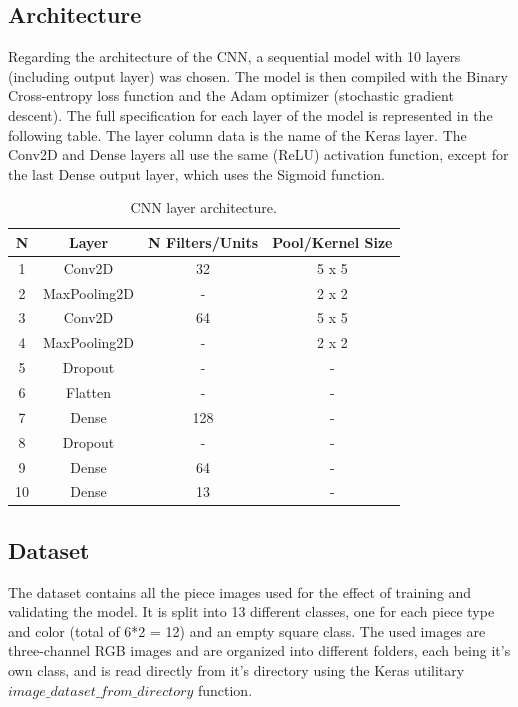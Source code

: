 \documentclass[10pt]{article}
\begin{document}
\subsection{Architecture}

Regarding the architecture of the CNN, a sequential \cite{3} model with 10 layers (including output layer) was chosen. The model is then compiled with the Binary Cross-entropy loss function and the Adam optimizer (stochastic gradient descent). The full specification for each layer of the model is represented in the following table. The layer column data is the name of the Keras layer. The Conv2D and Dense layers all use the same (ReLU) activation function, except for the last Dense output layer, which uses the Sigmoid function.

\begin{table}[H]
	\centering
	\begin{tabular}{||c c c c||} 
		\hline
		N & Layer & N Filters/Units & Pool/Kernel Size \\ [0.5ex] 
		\hline\hline
		1 & Conv2D & 32 & 5 x 5\\ 
		\hline
		2 & MaxPooling2D & - & 2 x 2 \\
		\hline
		3 & Conv2D & 64 & 5 x 5 \\
		\hline
		4 & MaxPooling2D & - & 2 x 2 \\
		\hline
		5 & Dropout & - & - \\ [1ex] 
		\hline
		6 & Flatten & - & - \\ [1ex] 
		\hline
		7 & Dense & 128 & - \\ [1ex] 
		\hline
		8 & Dropout & - & - \\ [1ex] 
		\hline
		9 & Dense & 64 & - \\ [1ex] 
		\hline
		10 & Dense & 13 & - \\ [1ex] 
		\hline
	\end{tabular}
	\caption{\label{tab:cnn-architecture}CNN layer architecture.}
\end{table}

\pagebreak

\subsection{Dataset}

The dataset contains all the piece images used for the effect of training and validating the model. It is split into 13 different classes, one for each piece type and color (total of 6*2 = 12) and an empty square class. The used images are three-channel RGB images and are organized into different folders, each being it's own class, and is read directly from it's directory using the Keras utilitary $\textit{image\_dataset\_from\_directory}$ function.
\end{document}
